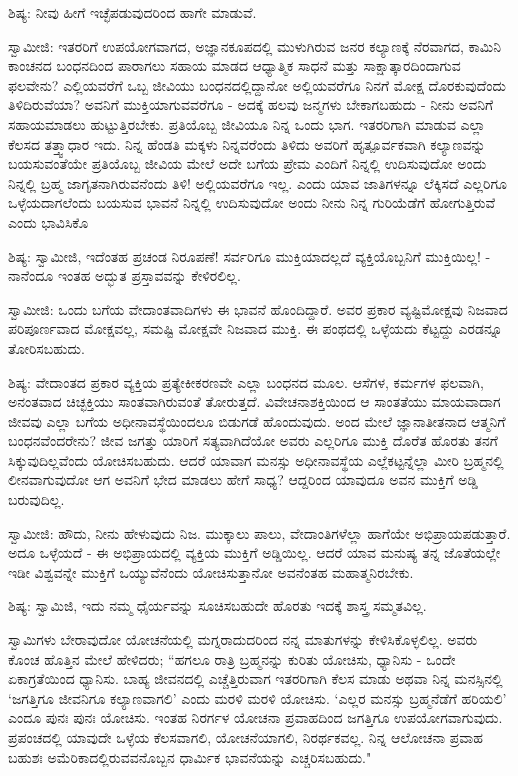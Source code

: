 ಶಿಷ್ಯ: ನೀವು ಹೀಗೆ ಇಚ್ಛೆಪಡುವುದರಿಂದ ಹಾಗೇ ಮಾಡುವೆ.

ಸ್ವಾಮೀಜಿ: ಇತರರಿಗೆ ಉಪಯೋಗವಾಗದ, ಅಜ್ಞಾನಕೂಪದಲ್ಲಿ ಮುಳುಗಿರುವ ಜನರ ಕಲ್ಯಾಣಕ್ಕೆ ನೆರವಾಗದ, ಕಾಮಿನಿ ಕಾಂಚನದ ಬಂಧನದಿಂದ ಪಾರಾಗಲು ಸಹಾಯ ಮಾಡದ ಆಧ್ಯಾತ್ಮಿಕ ಸಾಧನೆ ಮತ್ತು ಸಾಕ್ಷಾತ್ಕಾರದಿಂದಾಗುವ ಫಲವೇನು? ಎಲ್ಲಿಯವರೆಗೆ ಒಬ್ಬ ಜೀವಿಯು ಬಂಧನದಲ್ಲಿದ್ದಾನೋ ಅಲ್ಲಿಯವರೆಗೂ ನಿನಗೆ ಮೋಕ್ಷ ದೊರಕುವುದೆಂದು ತಿಳಿದಿರುವೆಯಾ? ಅವನಿಗೆ ಮುಕ್ತಿಯಾಗುವವರೆಗೂ - ಅದಕ್ಕೆ ಹಲವು ಜನ್ಮಗಳು ಬೇಕಾಗಬಹುದು - ನೀನು ಅವನಿಗೆ ಸಹಾಯಮಾಡಲು ಹುಟ್ಟುತ್ತಿರಬೇಕು. ಪ್ರತಿಯೊಬ್ಬ ಜೀವಿಯೂ ನಿನ್ನ ಒಂದು ಭಾಗ. ಇತರರಿಗಾಗಿ ಮಾಡುವ ಎಲ್ಲಾ ಕೆಲಸದ ತತ್ತ್ವಾಧಾರ ಇದು. ನಿನ್ನ ಹೆಂಡತಿ ಮಕ್ಕಳು ನಿನ್ನವರೆಂದು ತಿಳಿದು ಅವರಿಗೆ ಹೃತ್ಪೂರ್ವಕವಾಗಿ ಕಲ್ಯಾಣವನ್ನು ಬಯಸುವಂತೆಯೇ ಪ್ರತಿಯೊಬ್ಬ ಜೀವಿಯ ಮೇಲೆ ಅದೇ ಬಗೆಯ ಪ್ರೇಮ ಎಂದಿಗೆ ನಿನ್ನಲ್ಲಿ ಉದಿಸುವುದೋ ಅಂದು ನಿನ್ನಲ್ಲಿ ಬ್ರಹ್ಮ ಜಾಗೃತನಾಗಿರುವನೆಂದು ತಿಳಿ! ಅಲ್ಲಿಯವರೆಗೂ ಇಲ್ಲ. ಎಂದು ಯಾವ ಜಾತಿಗಳನ್ನೂ ಲೆಕ್ಕಿಸದೆ ಎಲ್ಲರಿಗೂ ಒಳ್ಳೆಯದಾಗಲೆಂದು ಬಯಸುವ ಭಾವನೆ ನಿನ್ನಲ್ಲಿ ಉದಿಸುವುದೋ ಅಂದು ನೀನು ನಿನ್ನ ಗುರಿಯೆಡೆಗೆ ಹೋಗುತ್ತಿರುವೆ ಎಂದು ಭಾವಿಸಿಕೊ

ಶಿಷ್ಯ: ಸ್ವಾಮೀಜಿ, ಇದೆಂತಹ ಪ್ರಚಂಡ ನಿರೂಪಣೆ! ಸರ್ವರಿಗೂ ಮುಕ್ತಿಯಾದಲ್ಲದೆ ವ್ಯಕ್ತಿಯೊಬ್ಬನಿಗೆ ಮುಕ್ತಿಯಿಲ್ಲ! - ನಾನೆಂದೂ ಇಂತಹ ಅದ್ಭುತ ಪ್ರಸ್ತಾವವನ್ನು ಕೇಳಿರಲಿಲ್ಲ.

ಸ್ವಾಮೀಜಿ: ಒಂದು ಬಗೆಯ ವೇದಾಂತವಾದಿಗಳು ಈ ಭಾವನೆ ಹೊಂದಿದ್ದಾರೆ. ಅವರ ಪ್ರಕಾರ ವ್ಯಷ್ಟಿಮೋಕ್ಷವು ನಿಜವಾದ ಪರಿಪೂರ್ಣವಾದ ಮೋಕ್ಷವಲ್ಲ, ಸಮಷ್ಟಿ ಮೋಕ್ಷವೇ ನಿಜವಾದ ಮುಕ್ತಿ. ಈ ಪಂಥದಲ್ಲಿ ಒಳ್ಳೆಯದು ಕೆಟ್ಟದ್ದು ಎರಡನ್ನೂ ತೋರಿಸಬಹುದು.

ಶಿಷ್ಯ: ವೇದಾಂತದ ಪ್ರಕಾರ ವ್ಯಕ್ತಿಯ ಪ್ರತ್ಯೇಕೀಕರಣವೇ ಎಲ್ಲಾ ಬಂಧನದ ಮೂಲ. ಆಸೆಗಳ, ಕರ್ಮಗಳ ಫಲವಾಗಿ, ಅನಂತವಾದ ಚಿಚ್ಛಕ್ತಿಯು ಸಾಂತವಾಗಿರುವಂತೆ ತೋರುತ್ತದೆ. ವಿವೇಚನಾಶಕ್ತಿಯಿಂದ ಆ ಸಾಂತತೆಯು ಮಾಯವಾದಾಗ ಜೀವವು ಎಲ್ಲಾ ಬಗೆಯ ಅಧೀನಾವಸ್ಥೆಯಿಂದಲೂ ಬಿಡುಗಡೆ ಹೊಂದುವುದು. ಅಂದ ಮೇಲೆ ಜ್ಞಾನಾತೀತನಾದ ಆತ್ಮನಿಗೆ ಬಂಧನವೆಂದರೇನು? ಜೀವ ಜಗತ್ತು ಯಾರಿಗೆ ಸತ್ಯವಾಗಿದೆಯೋ ಅವರು ಎಲ್ಲರಿಗೂ ಮುಕ್ತಿ ದೊರೆತ ಹೊರತು ತನಗೆ ಸಿಕ್ಕುವುದಿಲ್ಲವೆಂದು ಯೋಚಿಸಬಹುದು. ಆದರೆ ಯಾವಾಗ ಮನಸ್ಸು ಅಧೀನಾವಸ್ಥೆಯ ಎಲ್ಲೆಕಟ್ಟನ್ನೆಲ್ಲಾ ಮೀರಿ ಬ್ರಹ್ಮನಲ್ಲಿ ಲೀನವಾಗುವುದೋ ಆಗ ಅವನಿಗೆ ಭೇದ ಮಾಡಲು ಹೇಗೆ ಸಾಧ್ಯ? ಆದ್ದರಿಂದ ಯಾವುದೂ ಅವನ ಮುಕ್ತಿಗೆ ಅಡ್ಡಿ ಬರುವುದಿಲ್ಲ.

ಸ್ವಾಮೀಜಿ: ಹೌದು, ನೀನು ಹೇಳುವುದು ನಿಜ. ಮುಕ್ಕಾಲು ಪಾಲು, ವೇದಾಂತಿಗಳೆಲ್ಲಾ ಹಾಗೆಯೇ ಅಭಿಪ್ರಾಯಪಡುತ್ತಾರೆ. ಅದೂ ಒಳ್ಳೆಯದೆ - ಈ ಅಭಿಪ್ರಾಯದಲ್ಲಿ ವ್ಯಕ್ತಿಯ ಮುಕ್ತಿಗೆ ಅಡ್ಡಿಯಿಲ್ಲ. ಆದರೆ ಯಾವ ಮನುಷ್ಯ ತನ್ನ ಜೊತೆಯಲ್ಲೇ ಇಡೀ ವಿಶ್ವವನ್ನೇ ಮುಕ್ತಿಗೆ ಒಯ್ಯುವೆನೆಂದು ಯೋಚಿಸುತ್ತಾನೋ ಅವನೆಂತಹ ಮಹಾತ್ಮನಿರಬೇಕು.

ಶಿಷ್ಯ: ಸ್ವಾಮಿಜಿ, ಇದು ನಮ್ಮ ಧೈರ್ಯವನ್ನು ಸೂಚಿಸಬಹುದೇ ಹೊರತು ಇದಕ್ಕೆ ಶಾಸ್ತ್ರ ಸಮ್ಮತವಿಲ್ಲ.

ಸ್ವಾಮಿಗಳು ಬೇರಾವುದೋ ಯೋಚನೆಯಲ್ಲಿ ಮಗ್ನರಾದುದರಿಂದ ನನ್ನ ಮಾತುಗಳನ್ನು ಕೇಳಿಸಿಕೊಳ್ಳಲಿಲ್ಲ. ಅವರು ಕೊಂಚ ಹೊತ್ತಿನ ಮೇಲೆ ಹೇಳಿದರು; “ಹಗಲೂ ರಾತ್ರಿ ಬ್ರಹ್ಮನನ್ನು ಕುರಿತು ಯೋಚಿಸು, ಧ್ಯಾನಿಸು - ಒಂದೇ ಏಕಾಗ್ರತೆಯಿಂದ ಧ್ಯಾನಿಸು. ಬಾಹ್ಯ ಜೀವನದಲ್ಲಿ ಎಚ್ಚೆತ್ತಿರುವಾಗ ಇತರರಿಗಾಗಿ ಕೆಲಸ ಮಾಡು ಅಥವಾ ನಿನ್ನ ಮನಸ್ಸಿನಲ್ಲಿ ‘ಜಗತ್ತಿಗೂ ಜೀವನಿಗೂ ಕಲ್ಯಾಣವಾಗಲಿ’ ಎಂದು ಮರಳಿ ಮರಳಿ ಯೋಚಿಸು. ‘ಎಲ್ಲರ ಮನಸ್ಸು ಬ್ರಹ್ಮನೆಡೆಗೆ ಹರಿಯಲಿ’ ಎಂದೂ ಪುನಃ ಪುನಃ ಯೋಚಿಸು. ಇಂತಹ ನಿರರ್ಗಳ ಯೋಚನಾ ಪ್ರವಾಹದಿಂದ ಜಗತ್ತಿಗೂ ಉಪಯೋಗವಾಗುವುದು. ಪ್ರಪಂಚದಲ್ಲಿ ಯಾವುದೇ ಒಳ್ಳೆಯ ಕೆಲಸವಾಗಲಿ, ಯೋಚನೆಯಾಗಲಿ, ನಿರರ್ಥಕವಲ್ಲ. ನಿನ್ನ ಆಲೋಚನಾ ಪ್ರವಾಹ ಬಹುಶಃ ಅಮೆರಿಕಾದಲ್ಲಿರುವವನೊಬ್ಬನ ಧಾರ್ಮಿಕ ಭಾವನೆಯನ್ನು ಎಚ್ಚರಿಸಬಹುದು."

